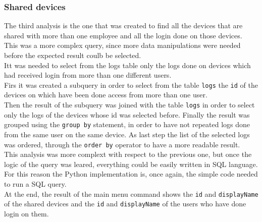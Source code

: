 \documentclass[12pt, a4paper, oneside]{article}
\begin{document}
\subsubsection{Shared devices}
The third analysis is the one that was created to find all the devices that are shared with more than one employee and all the login done on those devices.\\
This was a more complex query, since more data manipulations were needed before the expected result coulb be selected.\\
Itt was needed to select from the logs table only the logs done on devices which had received login from more than one different users.\\
Firs it was created a subquery in order to select from the table \texttt{logs} the \texttt{id} of the devices on which have been done access from more than one user.\\ 
Then the result of the subquery was joined with the table \texttt{logs} in order to select only the logs of the devices whose id was selected before. Finally the result was grouped using the \texttt{group by}
statement, in order to have not repeated logs done from the same user on the same device. As last step the list of the selected logs was ordered, through the \texttt{order by} operator to have a more 
readable result.\\  
This analysis was more complext with respect to the previous one, but once the logic of the query was leared, everything could be easily written in SQL language.
For this reason the Python implementation is, once again, the simple code needed to run a SQL query.\\
At the end, the result of the main menu command shows the \texttt{id} and \texttt{displayName} of the shared devices and the \texttt{id} and \texttt{displayName} of the users who have done login on them.
\end{document}
